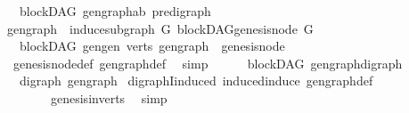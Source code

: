 \begin{isabellebody}
%
\isamarkuptrue%
%
\endisatagdocument
{\isafolddocument}%
%
\isadelimdocument
%
\endisadelimdocument
{}\isamarkupfalse%
\ {\isacharparenleft}{\kern0pt}\ blockDAG{\isacharparenright}{\kern0pt}\ gen{\isacharunderscore}{\kern0pt}graph{\isacharcolon}{\kern0pt}{\isacharcolon}{\kern0pt}{\isachardoublequoteopen}{\isacharparenleft}{\kern0pt}{\isacharprime}{\kern0pt}a{\isacharcomma}{\kern0pt}{\isacharprime}{\kern0pt}b{\isacharparenright}{\kern0pt}\ pre{\isacharunderscore}{\kern0pt}digraph{\isachardoublequoteclose}\ \ \isanewline
{\isachardoublequoteopen}gen{\isacharunderscore}{\kern0pt}graph\ {\isacharequal}{\kern0pt}\ induce{\isacharunderscore}{\kern0pt}subgraph\ G\ {\isacharbraceleft}{\kern0pt}blockDAG{\isachardot}{\kern0pt}genesis{\isacharunderscore}{\kern0pt}node\ G{\isacharbraceright}{\kern0pt}{\isachardoublequoteclose}\isanewline
\isanewline
{}\isamarkupfalse%
\ {\isacharparenleft}{\kern0pt}\ blockDAG{\isacharparenright}{\kern0pt}\ gen{\isacharunderscore}{\kern0pt}gen\ {\isacharcolon}{\kern0pt}{\isachardoublequoteopen}verts\ {\isacharparenleft}{\kern0pt}gen{\isacharunderscore}{\kern0pt}graph{\isacharparenright}{\kern0pt}\ {\isacharequal}{\kern0pt}\ {\isacharbraceleft}{\kern0pt}genesis{\isacharunderscore}{\kern0pt}node{\isacharbraceright}{\kern0pt}{\isachardoublequoteclose}\ \isanewline
%
\isadelimproof
\ \ %
\endisadelimproof
%
\isatagproof
{}\isamarkupfalse%
\ genesis{\isacharunderscore}{\kern0pt}node{\isacharunderscore}{\kern0pt}def\ gen{\isacharunderscore}{\kern0pt}graph{\isacharunderscore}{\kern0pt}def\ \isamarkupfalse%
\ simp%
\endisatagproof
{\isafoldproof}%
%
\isadelimproof
\isanewline
%
\endisadelimproof
\ \ \ \isanewline
{}\isamarkupfalse%
\ {\isacharparenleft}{\kern0pt}\ blockDAG{\isacharparenright}{\kern0pt}\ gen{\isacharunderscore}{\kern0pt}graph{\isacharunderscore}{\kern0pt}digraph{\isacharcolon}{\kern0pt}\isanewline
\ \ {\isachardoublequoteopen}digraph\ gen{\isacharunderscore}{\kern0pt}graph{\isachardoublequoteclose}\isanewline
%
\isadelimproof
%
\endisadelimproof
%
\isatagproof
{}\isamarkupfalse%
\ digraphI{\isacharunderscore}{\kern0pt}induced\ induced{\isacharunderscore}{\kern0pt}induce\ gen{\isacharunderscore}{\kern0pt}graph{\isacharunderscore}{\kern0pt}def\ \isanewline
\ \ \ \ \ \ \ genesis{\isacharunderscore}{\kern0pt}in{\isacharunderscore}{\kern0pt}verts\ \isamarkupfalse%
\ simp%
\endisatagproof
{\isafoldproof}%
%
\isadelimproof

\end{isabellebody}
